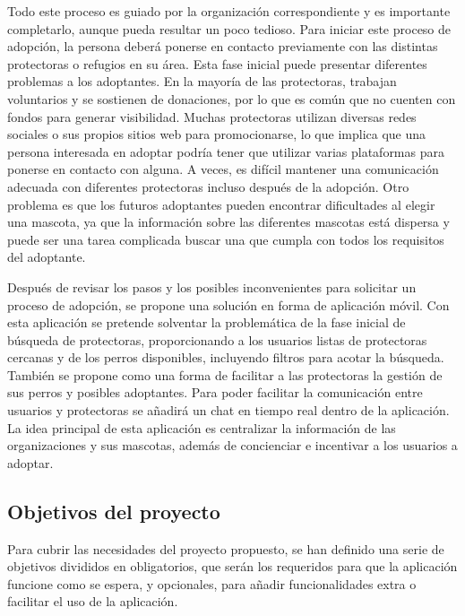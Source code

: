 \documentclass[a4paper, 12pt]{article}
\begin{document}
Todo este proceso es guiado por la organización correspondiente y es importante completarlo, aunque pueda resultar un poco tedioso. Para iniciar este proceso de adopción, la persona deberá ponerse en contacto previamente con las distintas protectoras o refugios en su área. Esta fase inicial puede presentar diferentes problemas a los adoptantes. En la mayoría de las protectoras, trabajan voluntarios y se sostienen de donaciones, por lo que es común que no cuenten con fondos para generar visibilidad. Muchas protectoras utilizan diversas redes sociales o sus propios sitios web para promocionarse, lo que implica que una persona interesada en adoptar podría tener que utilizar varias plataformas para ponerse en contacto con alguna. A veces, es difícil mantener una comunicación adecuada con diferentes protectoras incluso después de la adopción. Otro problema es que los futuros adoptantes pueden encontrar dificultades al elegir una mascota, ya que la información sobre las diferentes mascotas está dispersa y puede ser una tarea complicada buscar una que cumpla con todos los requisitos del adoptante.

Después de revisar los pasos y los posibles inconvenientes para solicitar un proceso de adopción, se propone una solución en forma de aplicación móvil. Con esta aplicación se pretende solventar la problemática de la fase inicial de búsqueda de protectoras, proporcionando a los usuarios listas de protectoras cercanas y de los perros disponibles, incluyendo filtros para acotar la búsqueda. También se propone como una forma de facilitar a las protectoras la gestión de sus perros y posibles adoptantes. Para poder facilitar la comunicación entre usuarios y protectoras se añadirá un chat en tiempo real dentro de la aplicación. La idea principal de esta aplicación es centralizar la información de las organizaciones y sus mascotas, además de concienciar e incentivar a los usuarios a adoptar.


\newpage
\subsection{Objetivos del proyecto}

Para cubrir las necesidades del proyecto propuesto, se han definido una serie de objetivos divididos en obligatorios, que serán los requeridos para que la aplicación funcione como se espera, y opcionales, para añadir funcionalidades extra o facilitar el uso de la aplicación.
\end{document}
